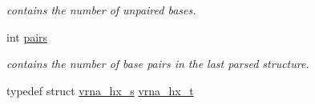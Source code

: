 \begin{DoxyCompactItemize}
\begin{DoxyCompactList}\small\item\em contains the number of unpaired bases. \end{DoxyCompactList}\item 
int \hyperlink{group__struct__utils_ga6341cbb704924824e0236c1dce791032}{pairs}\hypertarget{group__struct__utils_ga6341cbb704924824e0236c1dce791032}{}\label{group__struct__utils_ga6341cbb704924824e0236c1dce791032}

\begin{DoxyCompactList}\small\item\em contains the number of base pairs in the last parsed structure. \end{DoxyCompactList}\end{DoxyCompactItemize}
\begin{DoxyCompactItemize}
\item 
typedef struct \hyperlink{structvrna__hx__s}{vrna\+\_\+hx\+\_\+s} \hyperlink{group__struct__utils_ga877363f3a1703b53ecd025c6fcf897a0}{vrna\+\_\+hx\+\_\+t}\hypertarget{group__struct__utils_ga877363f3a1703b53ecd025c6fcf897a0}{}\label{group__struct__utils_ga877363f3a1703b53ecd025c6fcf897a0}


\end{DoxyCompactItemize}
